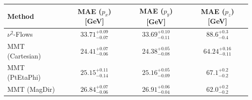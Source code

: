     \begin{tabular}{lccc}
        \toprule
        Method & MAE ($p_x$) [GeV] & MAE ($p_y$) [GeV] & MAE ($p_z$) [GeV] \\
        \midrule
        $\nu^2$-Flows & $33.71^{+0.09}_{-0.07}$ & $33.69^{+0.10}_{-0.11}$ & $88.6^{+0.3}_{-0.4}$ \\
        MMT (Cartesian) & $24.41^{+0.07}_{-0.06}$ & $24.38^{+0.05}_{-0.08}$ & $64.24^{+0.16}_{-0.11}$ \\
        MMT (PtEtaPhi) & $25.15^{+0.11}_{-0.14}$ & $25.16^{+0.05}_{-0.09}$ & $67.1^{+0.2}_{-0.2}$ \\
        MMT (MagDir) & $26.84^{+0.07}_{-0.06}$ & $26.91^{+0.06}_{-0.04}$ & $62.0^{+0.2}_{-0.2}$ \\
        \bottomrule
    \end{tabular}